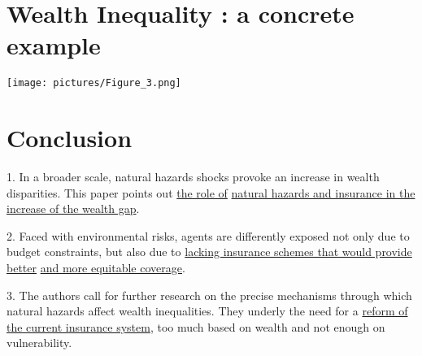 \documentclass{beamer}
\begin{document}
\section{Wealth Inequality : a concrete example}
    \begin{frame}{\secname}
        \texttt{[image: pictures/Figure\_3.png]}
    \end{frame}

\section{Conclusion}
    \begin{frame}{\secname}
        1. In a broader scale, natural hazards shocks provoke an increase in wealth disparities. 
        This paper points out \underline{the role of}
        \underline{natural hazards and insurance in the increase of the wealth gap}.

        2. Faced with environmental risks, agents are differently exposed not only due to budget constraints,
        but also due to \underline{lacking insurance schemes that would provide better} \underline{and more equitable
        coverage}.
        
        3. The authors call for further research on the precise mechanisms through which natural hazards affect wealth inequalities.
        They underly the need for a \underline{reform of} \underline{the current insurance system}, too much based on wealth and not enough on vulnerability.
    \end{frame}
\end{document}

